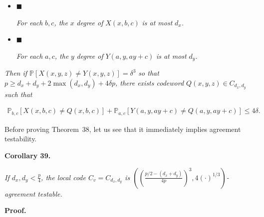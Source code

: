 \documentclass[10pt,a4paper]{article}
\begin{document}
\begin{itemize}


\item[] 
$\blacksquare$ 


\emph{For each }$b,c$\emph{, the }$x$\emph{ degree of }$X(x,b,c)$\emph{ is at most }$d_{x}$\emph{.}\par





\item[] 
$\blacksquare$ 


\emph{For each }$a,c$\emph{, the }$y$\emph{ degree of }$Y(a,y,ay+c)$\emph{ is at most }$d_{y}$\emph{.}\par





\end{itemize}


\emph{Then if $\mathbb{P}[X(x,y,z)\not=Y(x,y,z)]=\delta^{3}$ so that $p\geq d_{x}+d_{y}+2\max(d_{x},d_{y})+4\delta p$, there exists codeword $Q(x,y,z)\in C_{d_{x},d_{y}}$ such that}\par


\[\begin{gathered}
\mathbb{P}_{b,c}[X(x,b,c)\not=Q(x,b,c)]+\mathbb{P}_{a,c}[Y(a,y,ay+c)\not=Q(a,y,ay+c)]\leq 4\delta.
\end{gathered}\]






Before proving Theorem 38, let us see that it immediately implies agreement testability.\par





\par\medskip\noindent\textbf{
\textbf{Corollary 39}\textbf{.}
}\par



\emph{If $d_{x},d_{y}<\frac{p}{4}$, the local code $C_{v}=C_{d_{x},d_{y}}$ is $\left(\left(\frac{p/2-(d_{x}+d_{y})}{4p}\right)^{3},4(\cdot)^{1/3}\right)$-agreement testable.}\par






\par\medskip\noindent\textbf{Proof.}\par
\end{document}
